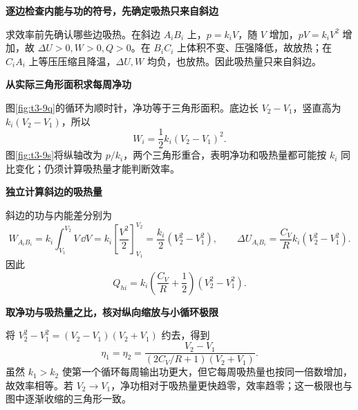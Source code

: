 \begin{solution}\textbf{逐边检查内能与功的符号，先确定吸热只来自斜边}\par\nobreak
求效率前先确认哪些边吸热。在斜边 $A_iB_i$ 上，$p=k_iV$，随 $V$ 增加，$pV=k_iV^2$ 增加，故 $\Delta U>0,W>0,Q>0$。在 $B_iC_i$ 上体积不变、压强降低，故放热；在 $C_iA_i$ 上等压压缩且降温，$\Delta U,W$ 均负，也放热。因此吸热量只来自斜边。


\par\medskip{}\noindent\textbf{从实际三角形面积求每周净功}\par\nobreak
图\ref{fig:t3-9q}的循环为顺时针，净功等于三角形面积。底边长 $V_2-V_1$，竖直高为 $k_i(V_2-V_1)$，所以
\[W_i=\frac12k_i(V_2-V_1)^2.\]
图\ref{fig:t3-9s}将纵轴改为 $p/k_i$，两个三角形重合，表明净功和吸热量都可能按 $k_i$ 同比变化；仍须计算吸热量才能判断效率。



\par\medskip{}\noindent\textbf{独立计算斜边的吸热量}\par\nobreak
斜边的功与内能差分别为
\[W_{A_iB_i}=k_i\int_{V_1}^{V_2}V\,\dd V
=k_i\left[\frac{V^2}{2}\right]_{V_1}^{V_2}
=\frac{k_i}{2}(V_2^2-V_1^2),\qquad
\Delta U_{A_iB_i}=\frac{C_V}{R}k_i(V_2^2-V_1^2).\]
因此
\[Q_{hi}=k_i\left(\frac{C_V}{R}+\frac12\right)(V_2^2-V_1^2).\]


\par\medskip{}\noindent\textbf{取净功与吸热量之比，核对纵向缩放与小循环极限}\par\nobreak
将 $V_2^2-V_1^2=(V_2-V_1)(V_2+V_1)$ 约去，得到
\[\boxed{\eta_1=\eta_2=\frac{V_2-V_1}{(2C_V/R+1)(V_2+V_1)}}.\]
虽然 $k_1>k_2$ 使第一个循环每周输出功更大，但它每周吸热量也按同一倍数增加，故效率相等。若 $V_2\to V_1$，净功相对于吸热量更快趋零，效率趋零；这一极限也与图中逐渐收缩的三角形一致。
\end{solution}
